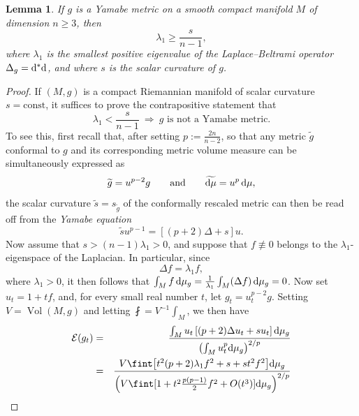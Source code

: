 \documentclass[pdftex]{sigma}
\numberwithin{equation}{section}
\newtheorem{Lemma}[Theorem]{Lemma}
\DeclareMathOperator{\Vol}{Vol}
\begin{document}
\begin{Lemma}\label{symptom}
If $g$ is a Yamabe metric on a smooth compact manifold $M$ of dimension $n\geq 3$, then
\begin{equation}\label{eigen}
\lambda_1 \geq \frac{s}{n-1},
\end{equation}
where $\lambda_1$ is the smallest positive eigenvalue of the Laplace--Beltrami operator $\Delta_{g} = {\rm d}^*{\rm d}$,
and where $s$ is the scalar curvature of $g$.
\end{Lemma}
\begin{proof}
If $(M,g)$ is a compact Riemannian manifold of scalar curvature $s=\text{const}$, it suffices to prove the contrapositive statement that
\begin{equation*}
\lambda_1 < \frac{s}{n-1} \ \Longrightarrow \ \mbox{$g$ is not a Yamabe metric.}
\end{equation*}
To see this, first recall that, after setting $p:=\frac{2n}{n-2}$, so that
any metric $\widetilde{g}$ conformal to $g$ and its corresponding metric volume measure can be simultaneously expressed as
\begin{equation*}
\widetilde{g}= u^{p-2}g \qquad \mbox{and} \qquad \widetilde{{\rm d}\mu} = u^p \,{\rm d}\mu,
\end{equation*}
the scalar curvature $\widetilde{s} = s_{\tilde{g}}$ of the conformally rescaled metric can then be read off from the
{\em Yamabe equation}
\begin{equation}
\label{yammer}
\widetilde{s} u^{p-1} = \left[(p+2) \Delta + s\right] u.
\end{equation}
Now
assume that $s > (n-1) \lambda_1 > 0$, and suppose that $f\not\equiv 0$ belongs to the $\lambda_1$-eigenspace of the Laplacian. In particular, since
\begin{equation*}
\Delta f = \lambda_1 f,
\end{equation*}
where $\lambda_1 > 0$, it then follows that $\int_M f\,{\rm d}\mu_g=\frac{1}{\lambda_1}\int_M (\Delta f)\,{\rm d}\mu_g=0$.
Now set $u_t = 1 + t f$, and, for every small real number $t$, let $g_t = u_t^{p-2}g$.
Setting $V= \Vol (M,g)$ and letting $\fint = {V}^{-1} \int_M$, we then have
\begin{eqnarray*}
\mathcal{E}(g_t)&=&\frac{\int_M u_t \left[ (p+2)\Delta u_t + s u_t\right] {\rm d}\mu_g}{\left(\int_M u_{t}^p{\rm d}\mu_g\right)^{2/p}} \\
&=&\frac{V\fint \big[ t^2 (p+2)\lambda_1f^2 + s+ s t^2 f^2 \big] {\rm d}\mu_g}{\left(V\fint [1+t^2 \frac{p(p-1)}{2} f^2 +O(t^3)] {\rm d}\mu_g\right)^{2/p}} \\

\end{eqnarray*}
\end{proof}
\end{document}

